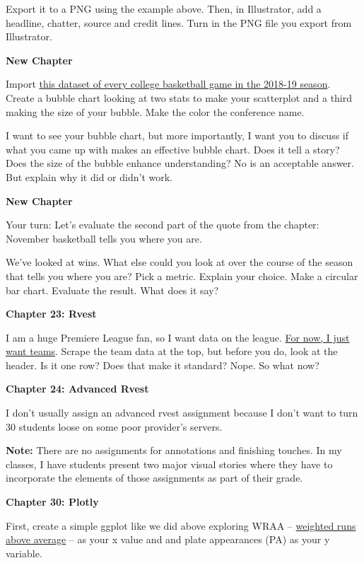 \documentclass[]{book}
\begin{document}
Export it to a PNG using the example above. Then, in Illustrator, add a headline, chatter, source and credit lines. Turn in the PNG file you export from Illustrator.

\textbf{New Chapter}

Import \href{https://unl.box.com/s/a8m91bro10t89watsyo13yjegb1fy009}{this dataset of every college basketball game in the 2018-19 season}. Create a bubble chart looking at two stats to make your scatterplot and a third making the size of your bubble. Make the color the conference name.

I want to see your bubble chart, but more importantly, I want you to discuss if what you came up with makes an effective bubble chart. Does it tell a story? Does the size of the bubble enhance understanding? No is an acceptable answer. But explain why it did or didn't work.

\textbf{New Chapter}

Your turn: Let's evaluate the second part of the quote from the chapter: November basketball tells you where you are.

We've looked at wins. What else could you look at over the course of the season that tells you where you are? Pick a metric. Explain your choice. Make a circular bar chart. Evaluate the result. What does it say?

\textbf{Chapter 23: Rvest}

I am a huge Premiere League fan, so I want data on the league. \href{https://fbref.com/en/comps/9/stats/Premier-League-Stats}{For now, I just want teams}. Scrape the team data at the top, but before you do, look at the header. Is it one row? Does that make it standard? Nope. So what now?

\textbf{Chapter 24: Advanced Rvest}

I don't usually assign an advanced rvest assignment because I don't want to turn 30 students loose on some poor provider's servers.

\textbf{Note:} There are no assignments for annotations and finishing touches. In my classes, I have students present two major visual stories where they have to incorporate the elements of those assignments as part of their grade.

\textbf{Chapter 30: Plotly}

First, create a simple ggplot like we did above exploring WRAA -- \href{http://m.mlb.com/glossary/advanced-stats/weighted-runs-above-average}{weighted runs above average} -- as your x value and and plate appearances (PA) as your y variable.
\end{document}
